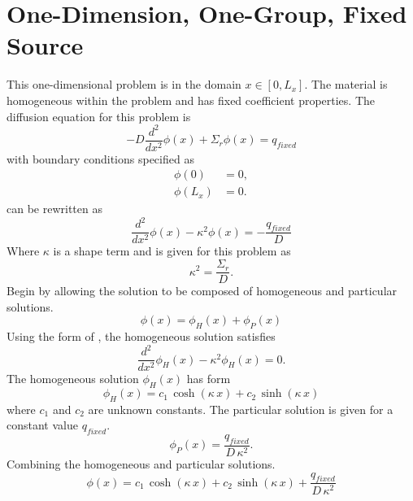 \section{One-Dimension, One-Group, Fixed Source}
  \label{sec:deriv_1dfixedsrc}
  This one-dimensional problem is in the domain $x \in [0,L_x]$. The material is
  homogeneous within the problem and has fixed coefficient properties.
  The diffusion equation for this problem is 
  \begin{equation}
    \label{eq:1dfixed}
    -D \frac{d^2}{dx^2} \phi(x) + \Sigma_r \phi(x) = q_{fixed}
  \end{equation}
  with boundary conditions specified as
  \begin{align}
    \label{eq:1dfixed_bc1}
    \phi(0) &= 0, \\
    \label{eq:1dfixed_bc2}
    \phi(L_x) &= 0.
  \end{align}
   can be rewritten as
  \begin{equation}
    \label{eq:1dfixed_buckle}
    \frac{d^2}{dx^2} \phi(x) - \kappa^2 \phi(x) = - \frac{q_{fixed}}{D}
  \end{equation}
  Where $\kappa$ is a shape term and is given for this problem as
  \begin{equation}
    \label{eq:1dfixed_b2}
    \kappa^2 = \frac{\Sigma_r}{D}.
  \end{equation}
  Begin by allowing the solution to be composed of homogeneous and particular
  solutions. 
  \begin{equation} 
    \phi(x) = \phi_H(x) + \phi_P(x)
  \end{equation}
  Using the form of , the homogeneous solution satisfies 
  \begin{equation}
    \label{eq:1dfixed_homog}
    \frac{d^2}{dx^2} \phi_H(x) - \kappa^2 \phi_H(x) = 0.
  \end{equation}
  The homogeneous solution $\phi_H(x)$ has form 
  \begin{equation}
    \label{eq:1dfixed_homog_form}
    \phi_H(x) = c_1 \, \cosh(\kappa \, x) + c_2 \, \sinh(\kappa \, x)
  \end{equation}
  where $c_1$ and $c_2$ are unknown constants.
  The particular solution is given for a constant value $q_{fixed}$.
  \begin{equation}
    \label{eq:1dfixed_particular}
    \phi_P(x) = \frac{q_{fixed}}{D\,\kappa^2}.
  \end{equation}
  Combining the homogeneous and particular solutions.
  \begin{equation}
    \label{eq:1dfixed_constants}
    \phi(x) = c_1 \, \cosh(\kappa \, x) + c_2 \, \sinh(\kappa \, x) +
      \frac{q_{fixed}}{D\,\kappa^2}
  \end{equation}
